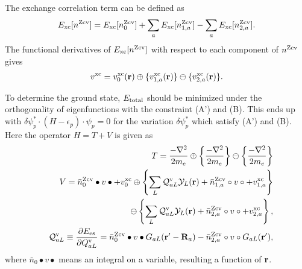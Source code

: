 \documentclass[a4paper,10pt,aip,onecolumn,amsmath,amssymb,floatfix,rmp]{revtex4-1}
\newcommand{\bfr}{{\bf r}}
\newcommand{\bfR}{{\bf R}}
\newcommand{\YY}{{\cal Y}}
\newcommand{\ooplus}{\oplus}
\newcommand{\oominus}{\ominus}
\def\EMAXm{ E^{\rm rmesh}_{\rm MAX} }
\def\EMAXm{ E^{\rm rmesh}_{\rm MAX} }
\def\nzcv{n^{\rm Zcv}}
\def\barnzcv{\bar{n}^{\rm Zcv}}
\def\RR{v}
\begin{document}
\begin{widetext}
\begin{widetext}
The exchange correlation term can be defined as
\begin{eqnarray}
E_{\rm xc}[\nzcv] = E_{\rm xc}[\nzcv_0] 
+  \sum_a E_{\rm xc}[\nzcv_{1,a}]  
-  \sum_a E_{\rm xc}[\nzcv_{2,a}].
\label{eq:exc}
\end{eqnarray}
The functional derivatives of $E_{\rm xc}[\nzcv]$
with respect to each component of $\nzcv$ gives
\begin{eqnarray}
v^{\rm xc} = v^{\rm xc}_0(\bfr)
\ooplus  \{v^{\rm xc}_{1,a}(\bfr)  \}
\oominus \{v^{\rm xc}_{2,a}(\bfr)  \}.
\label{eq:vxc}
\end{eqnarray}

To determine the ground state, 
$E_{\rm total}$ should be minimized under the orthogonality of eigenfunctions with
the constraint (A') and (B).
This ends up with 
$\delta \psi^*_p \cdot (H - \epsilon_p) \cdot \psi_p =0$ for
the variation $\delta \psi^*_p$ which satisfy (A') and (B). 
Here the operator $H=T+V$ is given as
\begin{eqnarray}
&&T=\frac{-\nabla^2 }{2m_e} \oplus \left\{\frac{-\nabla^2 }{2m_e}\right\} 
\ominus \left\{\frac{-\nabla^2 }{2m_e}\right\} \\
&&V= 
\barnzcv_0 \bullet v \bullet + v^{\rm xc}_0
\ooplus
\left\{ \sum_L
{\cal Q}^{\rm v}_{aL} \YY_L(\bfr)
+ \barnzcv_{1,a} \circ \RR \circ + v^{\rm xc}_{1,a} 
\right\} \nonumber \\
&&\oominus
\left\{ \sum_L
{\cal Q}^{\rm v}_{aL} \YY_L(\bfr)
+ \barnzcv_{2,a} \circ \RR \circ + v^{\rm xc}_{2,a} 
\right\}, \label{eq:v} \\
&&{\cal Q}^{\rm v}_{aL}\equiv \frac{\partial E_{\rm es}}{\partial {Q}^{\rm v}_{aL}} =
\barnzcv_0 \bullet v \bullet G_{aL}(\bfr'-\bfR_a)
-\barnzcv_{2,a} \circ \RR \circ G_{aL}(\bfr'), \label{eq:calqdef}
\end{eqnarray}
where $\bar{n}_0 \bullet v \bullet$ means an integral on a variable, resulting a function of $\bfr$.


\end{widetext}
\end{widetext}
\end{document}
